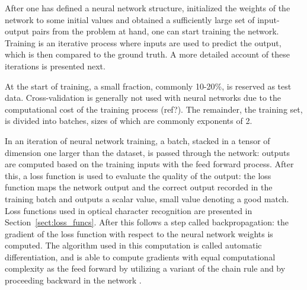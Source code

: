 \documentclass{article}
\begin{document}
After one has defined a neural network structure, initialized the weights of the network 
to some initial values and obtained a sufficiently large set of input-output pairs from the problem at hand,
one can start training the network. Training is an iterative process where inputs are used to 
predict the output, which is then compared to the ground truth. A more detailed account of these iterations
is presented next.

At the start of training, a small fraction, commonly 10-20\%, is reserved as test data. Cross-validation is 
generally not used with neural networks due to the computational cost of the training process (ref?). The remainder, 
the training set, is divided into batches, sizes of which are commonly exponents of 2.

In an iteration of neural network training, a batch, stacked in a tensor of dimension one larger than the dataset, 
is passed through the network: outputs are computed based on the training inputs with the feed forward process.
After this, a loss function is used to evaluate the quality of the output: the loss function maps the network output and 
the correct output recorded in the training batch and outputs a scalar value, small value denoting a good 
match. Loss functions used in optical character recognition are presented in Section~\ref{sect:loss_funcs}.
After this follows a step called backpropagation: the gradient of the loss function with respect 
to the neural network weights is computed. The algorithm used in this computation is called automatic differentiation,
and is able to compute gradients with equal computational complexity as the feed forward by utilizing 
a variant of the chain rule and by proceeding backward in the network \cite{princebook}.
\end{document}
